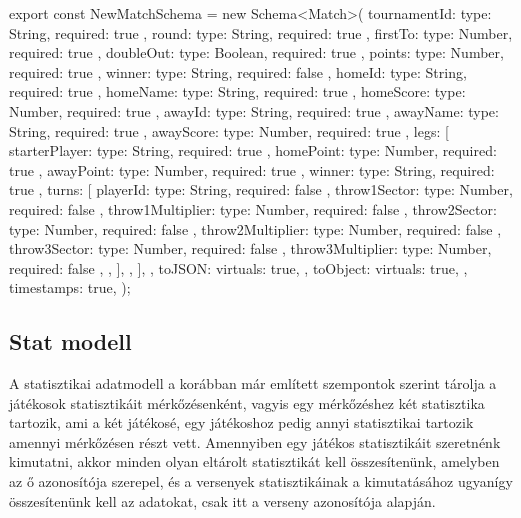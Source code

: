 \begin{cpp}
export const NewMatchSchema = new Schema<Match>(
  {
    tournamentId: { type: String, required: true },
    round: { type: String, required: true },
    firstTo: { type: Number, required: true },
    doubleOut: { type: Boolean, required: true },
    points: { type: Number, required: true },
    winner: { type: String, required: false },
    homeId: { type: String, required: true },
    homeName: { type: String, required: true },
    homeScore: { type: Number, required: true },
    awayId: { type: String, required: true },
    awayName: { type: String, required: true },
    awayScore: { type: Number, required: true },
    legs: [
      {
        starterPlayer: { type: String, required: true },
        homePoint: { type: Number, required: true },
        awayPoint: { type: Number, required: true },
        winner: { type: String, required: true },
        turns: [
          {
            playerId: { type: String, required: false },
            throw1Sector: { type: Number, required: false },
            throw1Multiplier: { type: Number, required: false },
            throw2Sector: { type: Number, required: false },
            throw2Multiplier: { type: Number, required: false },
            throw3Sector: { type: Number, required: false },
            throw3Multiplier: { type: Number, required: false },
          },
        ],
      },
    ],
  },
  {
    toJSON: {
      virtuals: true,
    },
    toObject: {
      virtuals: true,
    },
    timestamps: true,
  }
);
\end{cpp}

\subsection{Stat modell}
A statisztikai adatmodell a korábban már említett szempontok szerint tárolja a játékosok statisztikáit mérkőzésenként, vagyis egy mérkőzéshez két statisztika tartozik, ami a két játékosé, egy játékoshoz pedig annyi statisztikai tartozik amennyi mérkőzésen részt vett. Amennyiben egy játékos statisztikáit szeretnénk kimutatni, akkor minden olyan eltárolt statisztikát kell összesítenünk, amelyben az ő azonosítója szerepel, és a versenyek statisztikáinak a kimutatásához ugyanígy összesítenünk kell az adatokat, csak itt a verseny azonosítója alapján.

